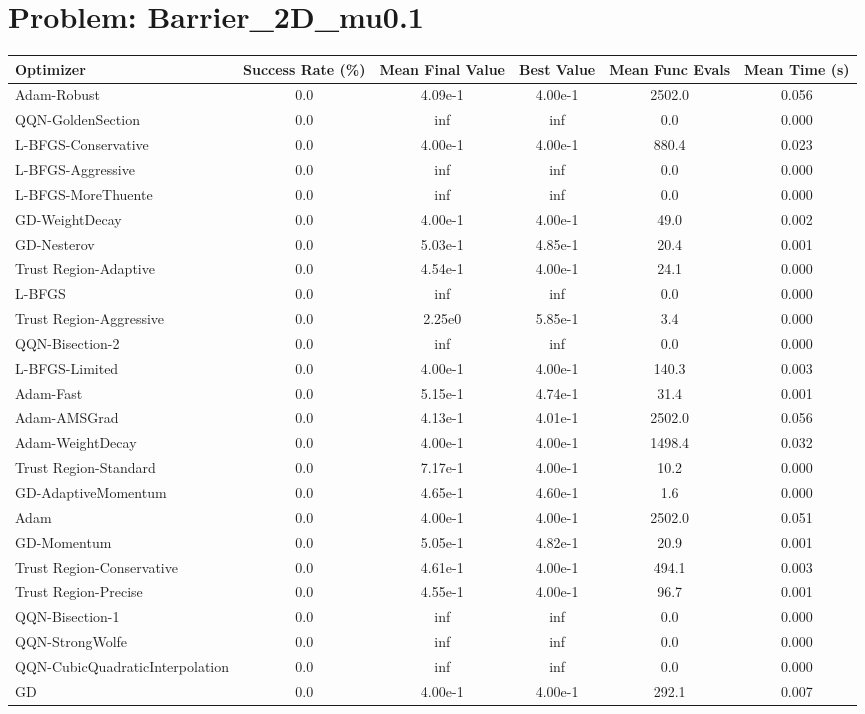 \documentclass{article}
\begin{document}
\section{Problem: Barrier\_2D\_mu0.1}
\begin{longtable}{p{3cm}*{5}{c}}
\toprule
\textbf{Optimizer} & \textbf{Success Rate (\%)} & \textbf{Mean Final Value} & \textbf{Best Value} & \textbf{Mean Func Evals} & \textbf{Mean Time (s)} \\
\midrule
Adam-Robust & 0.0 & 4.09e-1 & 4.00e-1 & 2502.0 & 0.056 \\
QQN-GoldenSection & 0.0 & inf & inf & 0.0 & 0.000 \\
L-BFGS-Conservative & 0.0 & 4.00e-1 & 4.00e-1 & 880.4 & 0.023 \\
L-BFGS-Aggressive & 0.0 & inf & inf & 0.0 & 0.000 \\
L-BFGS-MoreThuente & 0.0 & inf & inf & 0.0 & 0.000 \\
GD-WeightDecay & 0.0 & 4.00e-1 & 4.00e-1 & 49.0 & 0.002 \\
GD-Nesterov & 0.0 & 5.03e-1 & 4.85e-1 & 20.4 & 0.001 \\
Trust Region-Adaptive & 0.0 & 4.54e-1 & 4.00e-1 & 24.1 & 0.000 \\
L-BFGS & 0.0 & inf & inf & 0.0 & 0.000 \\
Trust Region-Aggressive & 0.0 & 2.25e0 & 5.85e-1 & 3.4 & 0.000 \\
QQN-Bisection-2 & 0.0 & inf & inf & 0.0 & 0.000 \\
L-BFGS-Limited & 0.0 & 4.00e-1 & 4.00e-1 & 140.3 & 0.003 \\
Adam-Fast & 0.0 & 5.15e-1 & 4.74e-1 & 31.4 & 0.001 \\
Adam-AMSGrad & 0.0 & 4.13e-1 & 4.01e-1 & 2502.0 & 0.056 \\
Adam-WeightDecay & 0.0 & 4.00e-1 & 4.00e-1 & 1498.4 & 0.032 \\
Trust Region-Standard & 0.0 & 7.17e-1 & 4.00e-1 & 10.2 & 0.000 \\
GD-AdaptiveMomentum & 0.0 & 4.65e-1 & 4.60e-1 & 1.6 & 0.000 \\
Adam & 0.0 & 4.00e-1 & 4.00e-1 & 2502.0 & 0.051 \\
GD-Momentum & 0.0 & 5.05e-1 & 4.82e-1 & 20.9 & 0.001 \\
Trust Region-Conservative & 0.0 & 4.61e-1 & 4.00e-1 & 494.1 & 0.003 \\
Trust Region-Precise & 0.0 & 4.55e-1 & 4.00e-1 & 96.7 & 0.001 \\
QQN-Bisection-1 & 0.0 & inf & inf & 0.0 & 0.000 \\
QQN-StrongWolfe & 0.0 & inf & inf & 0.0 & 0.000 \\
QQN-CubicQuadraticInterpolation & 0.0 & inf & inf & 0.0 & 0.000 \\
GD & 0.0 & 4.00e-1 & 4.00e-1 & 292.1 & 0.007 \\
\bottomrule
\end{longtable}
\end{document}
